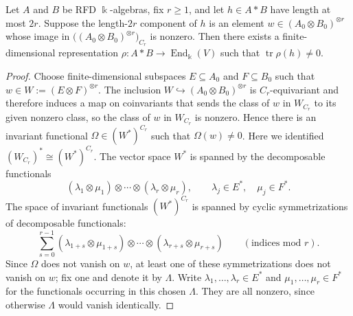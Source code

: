 \begin{proposition}\label{prop_cyclic_trace_detection}
    Let \(A\) and \(B\) be RFD \(\Bbbk\)-algebras, fix \(r\geq1\), and let \(h\in A*B\) have length at most \(2r\).
    Suppose the length-\(2r\) component of \(h\) is an element \(w\in(A_0\otimes B_0)^{\otimes r}\) whose image in \(\bigl((A_0\otimes B_0)^{\otimes r}\bigr)_{C_r}\) is nonzero.
    Then there exists a finite-dimensional representation \(\rho\colon A*B\to\operatorname{End}_{\Bbbk}(V)\) such that \(\operatorname{tr}\rho(h)\neq0\).
\end{proposition}
\begin{proof}
    Choose finite-dimensional subspaces \(E\subseteq A_0\) and \(F\subseteq B_0\) such that \(w\in W:=(E\otimes F)^{\otimes r}\).
    The inclusion \(W\hookrightarrow(A_0\otimes B_0)^{\otimes r}\) is \(C_r\)-equivariant and therefore induces a map on coinvariants that sends the class of \(w\) in \(W_{C_r}\) to its given nonzero class, so the class of \(w\) in \(W_{C_r}\) is nonzero.
    Hence there is an invariant functional \(\Omega\in(W^*)^{C_r}\) such that \(\Omega(w)\neq0\).
    Here we identified \((W_{C_r})^*\cong(W^*)^{C_r}\).
    The vector space \(W^*\) is spanned by the decomposable functionals
    \[
        (\lambda_1\otimes\mu_1)\otimes\cdots\otimes(\lambda_r\otimes\mu_r),
        \qquad \lambda_j\in E^*,\quad \mu_j\in F^*.
    \]
    The space of invariant functionals \((W^*)^{C_r}\) is spanned by cyclic symmetrizations of decomposable functionals:
    \[
        \sum_{s=0}^{r-1}(\lambda_{1+s}\otimes\mu_{1+s})\otimes\cdots\otimes(\lambda_{r+s}\otimes\mu_{r+s})
        \qquad(\text{indices mod }r).
    \]
    Since \(\Omega\) does not vanish on \(w\), at least one of these symmetrizations does not vanish on \(w\); fix one and denote it by \(\Lambda\).
    Write \(\lambda_1,\ldots,\lambda_r\in E^*\) and \(\mu_1,\ldots,\mu_r\in F^*\) for the functionals occurring in this chosen \(\Lambda\).
    They are all nonzero, since otherwise \(\Lambda\) would vanish identically.


\end{proof}
